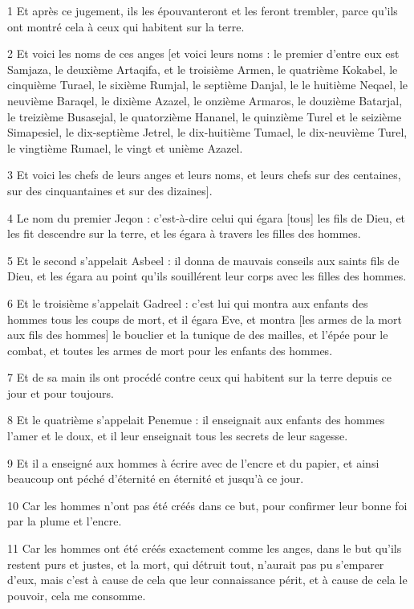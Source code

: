 \par 1 Et après ce jugement, ils les épouvanteront et les feront trembler, parce qu'ils ont montré cela à ceux qui habitent sur la terre.
\par 2 Et voici les noms de ces anges [et voici leurs noms : le premier d'entre eux est Samjaza, le deuxième Artaqifa, et le troisième Armen, le quatrième Kokabel, le cinquième Turael, le sixième Rumjal, le septième Danjal, le le huitième Neqael, le neuvième Baraqel, le dixième Azazel, le onzième Armaros, le douzième Batarjal, le treizième Busasejal, le quatorzième Hananel, le quinzième Turel et le seizième Simapesiel, le dix-septième Jetrel, le dix-huitième Tumael, le dix-neuvième Turel, le vingtième Rumael, le vingt et unième Azazel.
\par 3 Et voici les chefs de leurs anges et leurs noms, et leurs chefs sur des centaines, sur des cinquantaines et sur des dizaines].
\par 4 Le nom du premier Jeqon : c'est-à-dire celui qui égara [tous] les fils de Dieu, et les fit descendre sur la terre, et les égara à travers les filles des hommes.
\par 5 Et le second s'appelait Asbeel : il donna de mauvais conseils aux saints fils de Dieu, et les égara au point qu'ils souillérent leur corps avec les filles des hommes.
\par 6 Et le troisième s'appelait Gadreel : c'est lui qui montra aux enfants des hommes tous les coups de mort, et il égara Eve, et montra [les armes de la mort aux fils des hommes] le bouclier et la tunique de des mailles, et l'épée pour le combat, et toutes les armes de mort pour les enfants des hommes.
\par 7 Et de sa main ils ont procédé contre ceux qui habitent sur la terre depuis ce jour et pour toujours.
\par 8 Et le quatrième s'appelait Penemue : il enseignait aux enfants des hommes l'amer et le doux, et il leur enseignait tous les secrets de leur sagesse.
\par 9 Et il a enseigné aux hommes à écrire avec de l'encre et du papier, et ainsi beaucoup ont péché d'éternité en éternité et jusqu'à ce jour.
\par 10 Car les hommes n'ont pas été créés dans ce but, pour confirmer leur bonne foi par la plume et l'encre.
\par 11 Car les hommes ont été créés exactement comme les anges, dans le but qu'ils restent purs et justes, et la mort, qui détruit tout, n'aurait pas pu s'emparer d'eux, mais c'est à cause de cela que leur connaissance périt, et à cause de cela le pouvoir, cela me consomme.
